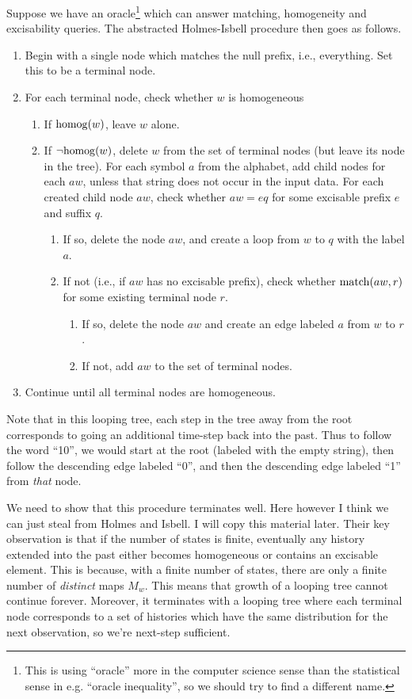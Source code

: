 \documentclass[../new-procedure.tex]{subfiles}
\begin{document}
Suppose we have an oracle\footnote{This is using ``oracle'' more in the
  computer science sense than the statistical sense in e.g. ``oracle
  inequality'', so we should try to find a different name.} which can answer
matching, homogeneity and excisability queries.  The abstracted Holmes-Isbell
procedure then goes as follows.
\begin{enumerate}
\item Begin with a single node which matches the null prefix, i.e., everything.
  Set this to be a terminal node.
\item For each terminal node, check whether $w$ is homogeneous
  \begin{enumerate}
  \item If $\mathrm{homog}(w)$, leave $w$ alone.
  \item If $\neg\mathrm{homog}(w)$, delete $w$ from the set of terminal nodes (but
    leave its node in the tree).  For each symbol $a$ from the alphabet, add
    child nodes for each $aw$, unless that string does not occur in the input
    data.  For each created child node $aw$, check whether $aw=eq$ for some
    excisable prefix $e$ and suffix $q$.
    \begin{enumerate}
    \item If so, delete the node $aw$, and create a loop from $w$ to $q$ with
      the label $a$.
    \item If not (i.e., if $aw$ has no excisable prefix), check whether
      $\mathrm{match}(aw,r)$ for some existing terminal node $r$.
      \begin{enumerate}
      \item If so, delete the node $aw$ and create an edge labeled $a$ from $w$
        to $r$.
      \item If not, add $aw$ to the set of terminal nodes.
      \end{enumerate}
    \end{enumerate}
  \end{enumerate}
\item Continue until all terminal nodes are homogeneous.
\end{enumerate}

Note that in this looping tree, each step in the tree away from the root
corresponds to going an additional time-step back into the past.  Thus to
follow the word ``10'', we would start at the root (labeled with the empty
string), then follow the descending edge labeled ``0'', and then the descending
edge labeled ``1'' from {\em that} node.

We need to show that this procedure terminates well.  Here however I think we
can just steal from Holmes and Isbell.  I will copy this material later.  Their
key observation is that if the number of states is finite, eventually any
history extended into the past either becomes homogeneous or contains an
excisable element.  This is because, with a finite number of states, there are
only a finite number of {\em distinct} maps $M_w$.  This means that growth of a
looping tree cannot continue forever.  Moreover, it terminates with a looping
tree where each terminal node corresponds to a set of histories which have the
same distribution for the next observation, so we're next-step sufficient.
\end{document}
